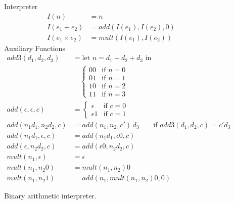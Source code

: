 \documentclass{tufte-handout}
\newcommand{\BR}[1]{(#1)}
\begin{document}
\begin{figure}
\noindent Interpreter 
\begin{align*}
I\BR{ n } &= n \\
I\BR{ e_1 + e_2 } &=
  \mathit{add}(I\BR{ e_1 }, I\BR{ e_2 },0) \\
I\BR{ e_1 \times e_2 } &=
  \mathit{mult}(I\BR{ e_1 }, I\BR{ e_2 })
\end{align*}
Auxiliary Functions
\begin{align*}
  \mathit{add3}(d_1, d_2, d_3) &= 
  \text{let } n = d_1 + d_2 + d_3 \text{ in } \\
  &\quad \begin{cases}
     00 &  \text{if } n = 0 \\
     01 &  \text{if } n = 1 \\
     10 &  \text{if } n = 2 \\
     11 &  \text{if } n = 3
  \end{cases}\\
 \mathit{add}(\epsilon, \epsilon, c) &= 
   \begin{cases}
      \epsilon  & \text{if } c = 0 \\
      \epsilon 1  & \text{if } c = 1
   \end{cases}
   \\
  \mathit{add}(n_1 d_1 , n_2 d_2, c) &= 
   \mathit{add}(n_1, n_2, c')\,d_3
  \qquad \text{if } \mathit{add3}(d_1, d_2, c) = c' d_3 \\
\mathit{add}(n_1 d_1 , \epsilon, c) &= 
  \mathit{add}(n_1 d_1 , \epsilon 0, c) \\
\mathit{add}(\epsilon, n_2 d_2, c) &= 
  \mathit{add}( \epsilon 0, n_2 d_2,c) \\[1ex]
 \mathit{mult}(n_1, \epsilon) &= \epsilon \\
 \mathit{mult}(n_1, n_2 0) &= \mathit{mult}(n_1,n_2) 0 \\
 \mathit{mult}(n_1, n_2 1) &= 
  \mathit{add}(n_1, \mathit{mult}(n_1,n_2)0, 0) 
\end{align*}
\caption{Binary arithmetic interpreter.}
\label{fig:interp-binary}
\end{figure}
\end{document}
